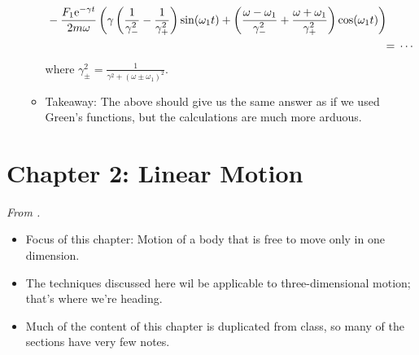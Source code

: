 \documentclass[../notes.tex]{subfiles}
\begin{document}
\begin{itemize}
\begin{itemize}
\begin{align*}
\begin{split}
                & -\frac{F_1\e[-\gamma t]}{2m\omega}\left( \gamma\left( \frac{1}{\gamma_-^2}-\frac{1}{\gamma_+^2} \right)\sin(\omega_1t)+\left( \frac{\omega-\omega_1}{\gamma_-^2}+\frac{\omega+\omega_1}{\gamma_+^2} \right)\cos(\omega_1t) \right)
            \end{split}\\
            ={}& \cdots
        \end{align*}
        where $\gamma_\pm^2=\frac{1}{\gamma^2+(\omega\pm\omega_1)^2}$.
        \item Takeaway: The above should give us the same answer as if we used Green's functions, but the calculations are much more arduous.
    \end{itemize}
\end{itemize}



\section{Chapter 2: Linear Motion}
\emph{From \textcite{bib:KibbleBerkshire}.}
\begin{itemize}
    \item {}Focus of this chapter: Motion of a body that is free to move only in one dimension.
    \item The techniques discussed here wil be applicable to three-dimensional motion; that's where we're heading.
    \item Much of the content of this chapter is duplicated from class, so many of the sections have very few notes.
\end{itemize}
\end{document}
